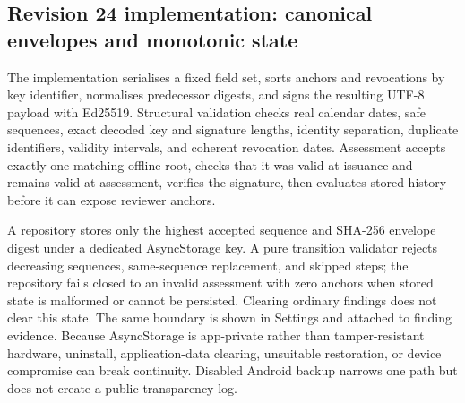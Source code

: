 

\subsection{Revision 24 implementation: canonical envelopes and monotonic state}

The implementation serialises a fixed field set, sorts anchors and revocations by key identifier, normalises predecessor digests, and signs the resulting UTF-8 payload with Ed25519. Structural validation checks real calendar dates, safe sequences, exact decoded key and signature lengths, identity separation, duplicate identifiers, validity intervals, and coherent revocation dates. Assessment accepts exactly one matching offline root, checks that it was valid at issuance and remains valid at assessment, verifies the signature, then evaluates stored history before it can expose reviewer anchors.

A repository stores only the highest accepted sequence and SHA-256 envelope digest under a dedicated AsyncStorage key. A pure transition validator rejects decreasing sequences, same-sequence replacement, and skipped steps; the repository fails closed to an invalid assessment with zero anchors when stored state is malformed or cannot be persisted. Clearing ordinary findings does not clear this state. The same boundary is shown in Settings and attached to finding evidence. Because AsyncStorage is app-private rather than tamper-resistant hardware, uninstall, application-data clearing, unsuitable restoration, or device compromise can break continuity. Disabled Android backup narrows one path but does not create a public transparency log.
